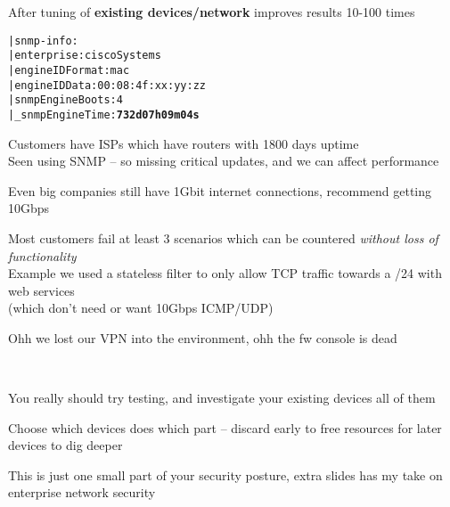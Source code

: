 \documentclass[Screen16to9,17pt]{foils}
\begin{document}
\vskip 1cm
\centerline{After tuning of {\bf existing devices/network} improves results 10-100 times}



\begin{alltt}\small
| snmp-info:
|   enterprise: ciscoSystems
|   engineIDFormat: mac
|   engineIDData: 00:08:4f:xx:yy:zz
|   snmpEngineBoots: 4
|_  snmpEngineTime: {\bf 732d07h09m04s}
\end{alltt}


\begin{list2}
\item Customers have ISPs which have routers with 1800 days uptime\\
Seen using SNMP -- so missing critical updates, and we can affect performance
\item Even big companies still have 1Gbit internet connections, recommend getting 10Gbps
\item Most customers fail at least 3 scenarios which can be countered \emph{without loss of functionality}\\
Example we used a stateless filter to only allow TCP traffic towards a /24 with web services\\
(which don't need or want 10Gbps ICMP/UDP)

\item Ohh we lost our VPN into the environment, ohh the fw console is dead
\end{list2}




~
\begin{list2}
\item You really should try testing, and investigate your existing devices
all of them
\item Choose which devices does which part -- discard early to free resources for later devices to dig deeper
\item This is just one small part of your security posture, extra slides has my take on enterprise network security
\end{list2}

\myquestionspage






\end{document}
